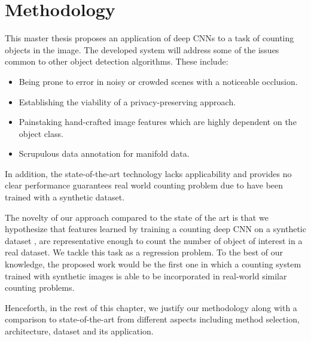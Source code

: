 \newpage
\chapter{Methodology}
\label{sec:proposal}
\noindent
This master thesis proposes an application of deep CNNs to a task of counting objects in the image. The developed system will address some of the issues common to other object detection algorithms. These include:
\begin{itemize}
	\item Being prone to error in noisy or crowded scenes with a noticeable occlusion. 
	\item Establishing the viability of a privacy-preserving approach. 
	\item {}Painstaking hand-crafted image features which are highly dependent on the object class. 
	\item {}Scrupulous data annotation for manifold data. 
\end{itemize} 
In addition, the state-of-the-art \cite{segui2015learning} technology lacks applicability  and provides no clear performance  guarantees real world counting problem\cite{chan2008privacy} due to have been trained with a synthetic dataset. 

The novelty of our approach compared to the state of the art is that we hypothesize that features learned by training a counting deep CNN on a synthetic dataset , are representative enough to count the number of object of interest in a real dataset. We tackle this task as a regression problem. 
To the best of our knowledge, the proposed work would be the first one in which a counting system trained with synthetic images is able to be incorporated in real-world similar counting problems.

Henceforth, in the rest of this chapter, we justify our methodology along with a comparison to state-of-the-art from different aspects including method selection, architecture, dataset and its application.   



